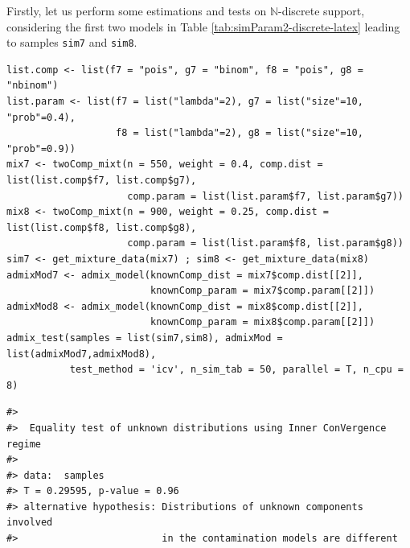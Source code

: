 \begin{table}[!h]
\centering
\caption{\label{tab:simParam2-discrete-latex}Parameters in the 2-sample case, with other support types (involving Binomial, Poisson, Negative Binomial, Uniform and Beta distributions).}
\centering
{}
\end{table}

Firstly, let us perform some estimations and tests on \(\mathbb{N}\)-discrete support, considering the first two models in Table \ref{tab:simParam2-discrete-latex} leading to samples \texttt{sim7} and \texttt{sim8}.

\begin{verbatim}
list.comp <- list(f7 = "pois", g7 = "binom", f8 = "pois", g8 = "nbinom")
list.param <- list(f7 = list("lambda"=2), g7 = list("size"=10, "prob"=0.4),
                   f8 = list("lambda"=2), g8 = list("size"=10, "prob"=0.9))
mix7 <- twoComp_mixt(n = 550, weight = 0.4, comp.dist = list(list.comp$f7, list.comp$g7),
                     comp.param = list(list.param$f7, list.param$g7))
mix8 <- twoComp_mixt(n = 900, weight = 0.25, comp.dist = list(list.comp$f8, list.comp$g8),
                     comp.param = list(list.param$f8, list.param$g8))
sim7 <- get_mixture_data(mix7) ; sim8 <- get_mixture_data(mix8)
admixMod7 <- admix_model(knownComp_dist = mix7$comp.dist[[2]],
                         knownComp_param = mix7$comp.param[[2]])
admixMod8 <- admix_model(knownComp_dist = mix8$comp.dist[[2]],
                         knownComp_param = mix8$comp.param[[2]])
admix_test(samples = list(sim7,sim8), admixMod = list(admixMod7,admixMod8),
           test_method = 'icv', n_sim_tab = 50, parallel = T, n_cpu = 8)
\end{verbatim}

\begin{verbatim}
#> 
#>  Equality test of unknown distributions using Inner ConVergence regime
#> 
#> data:  samples
#> T = 0.29595, p-value = 0.96
#> alternative hypothesis: Distributions of unknown components involved 
#>                         in the contamination models are different
\end{verbatim}

